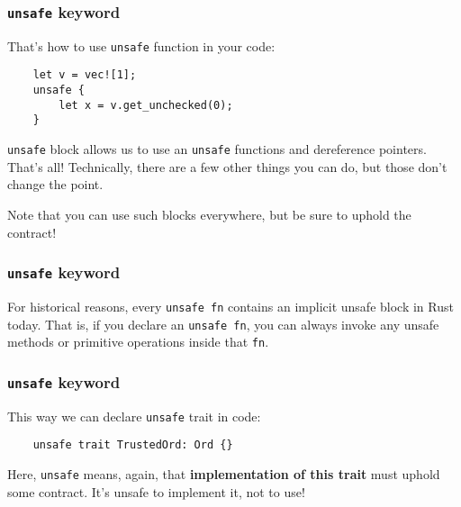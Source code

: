 \documentclass[aspectratio=1610,t]{beamer}
\begin{document}

\begin{frame}[fragile]
\frametitle{\texttt{unsafe} keyword}
That's how to use \texttt{unsafe} function in your code:

\begin{verbatim}
    let v = vec![1];
    unsafe {
        let x = v.get_unchecked(0);
    }
\end{verbatim}

\texttt{unsafe} block allows us to use an \texttt{unsafe} functions and dereference pointers. That's all! Technically, there are a few other things you can do, but those don't change the point.

Note that you can use such blocks everywhere, but be sure to uphold the contract!
\end{frame}


\begin{frame}[fragile]
\frametitle{\texttt{unsafe} keyword}
For historical reasons, every \texttt{unsafe fn} contains an implicit unsafe block in Rust today. That is, if you declare an \texttt{unsafe fn}, you can always invoke any unsafe methods or primitive operations inside that \texttt{fn}.


\end{frame}


\begin{frame}[fragile]
\frametitle{\texttt{unsafe} keyword}
This way we can declare \texttt{unsafe} trait in code:

\begin{verbatim}
    unsafe trait TrustedOrd: Ord {}
\end{verbatim}

Here, \texttt{unsafe} means, again, that \textbf{implementation of this trait} must uphold some contract. It's unsafe to implement it, not to use!

\end{frame}
\end{document}
